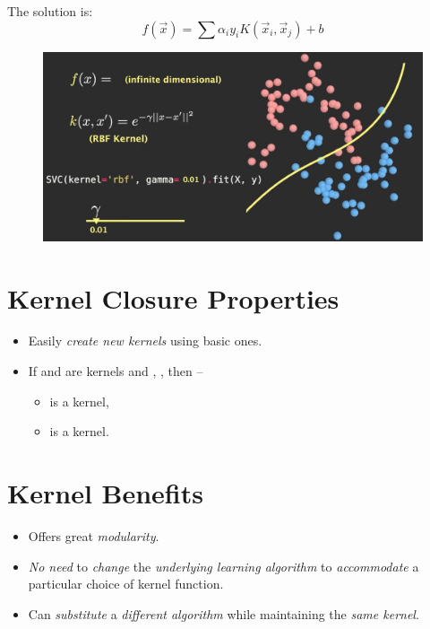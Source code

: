 \documentclass[
	number={2},
	title={Learning Linear Separators{,} SVMs and Kernels}
]{cs584notes}
\begin{document}
The solution is:
\begin{equation}
	f(\vec{x}) = \sum \alpha_{i} y_{i} K(\vec{x}_{i}, \vec{x}_{j}) + b
	\label{eq:non-linear-svms}
\end{equation}

\begin{figure}[H]
	\centering
	\includegraphics[width=\textwidth]{figures/2/infinite-dimension}
	\caption{}
	\label{fig:infinite-dimension}
\end{figure}

\section{Kernel Closure Properties}\label{sec:kernel-closure-properties}
\begin{itemize}
	\item Easily \emph{create new kernels} using basic ones.
	\item If  and  are kernels and , , then --
	\begin{itemize}
		\item {} is a kernel,
		\item {} is a kernel.
	\end{itemize}
\end{itemize}

\section{Kernel Benefits}\label{sec:kernel-benefits}
\begin{itemize}
	\item Offers great \emph{modularity}.
	\item \emph{No need} to \emph{change} the \emph{underlying learning algorithm} to \emph{accommodate} a particular choice of kernel function.
	\item Can \emph{substitute} a \emph{different algorithm} while maintaining the \emph{same kernel}.
\end{itemize}
\end{document}
